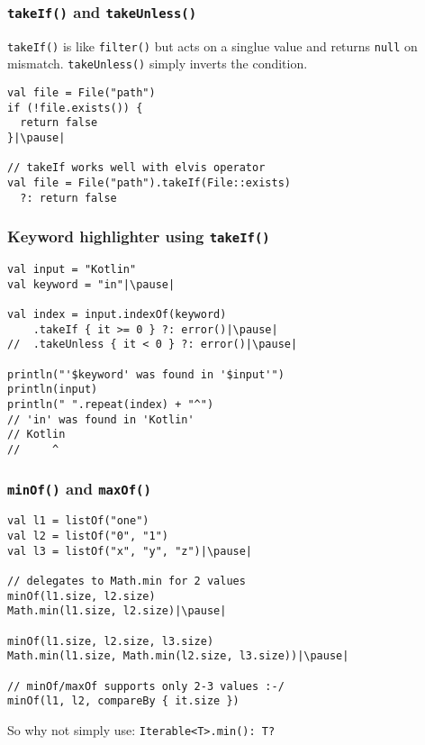 
\begin{frame}[fragile] \frametitle{\texttt{takeIf()} and \texttt{takeUnless()}}
\texttt{takeIf()} is like \texttt{filter()} but acts on a singlue value and returns \texttt{null} on mismatch. \texttt{takeUnless()} simply inverts the condition.
\begin{lstlisting}
val file = File("path")
if (!file.exists()) {
  return false
}|\pause|

// takeIf works well with elvis operator
val file = File("path").takeIf(File::exists)
  ?: return false
\end{lstlisting}
\end{frame}

\begin{frame}[fragile] \frametitle{Keyword highlighter using \texttt{takeIf()}}
\begin{lstlisting}
val input = "Kotlin"
val keyword = "in"|\pause|

val index = input.indexOf(keyword)
    .takeIf { it >= 0 } ?: error()|\pause|
//  .takeUnless { it < 0 } ?: error()|\pause|

println("'$keyword' was found in '$input'")
println(input)
println(" ".repeat(index) + "^")
// 'in' was found in 'Kotlin'
// Kotlin
//     ^
\end{lstlisting}
\end{frame}


\begin{frame}[fragile] \frametitle{\texttt{minOf()} and \texttt{maxOf()}}
\begin{lstlisting}
val l1 = listOf("one")
val l2 = listOf("0", "1")
val l3 = listOf("x", "y", "z")|\pause|

// delegates to Math.min for 2 values
minOf(l1.size, l2.size)
Math.min(l1.size, l2.size)|\pause|

minOf(l1.size, l2.size, l3.size)
Math.min(l1.size, Math.min(l2.size, l3.size))|\pause|

// minOf/maxOf supports only 2-3 values :-/
minOf(l1, l2, compareBy { it.size })
\end{lstlisting}
So why not simply use: \texttt{Iterable<T>.min(): T?}
\end{frame}

